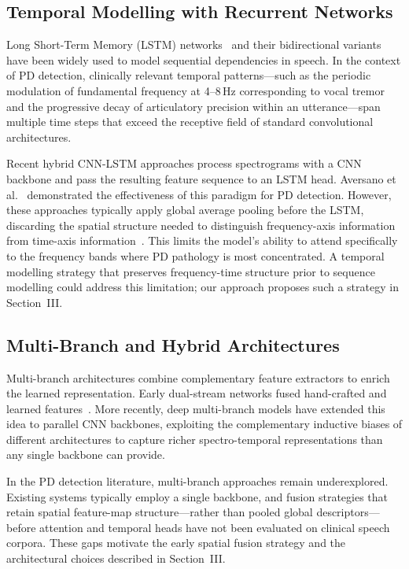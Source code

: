 \documentclass[conference]{IEEEtran}
\begin{document}
\subsection{Temporal Modelling with Recurrent Networks}

Long Short-Term Memory (LSTM) networks~\cite{hochreiter1997} and their bidirectional variants~\cite{graves2005} have been widely used to model sequential dependencies in speech. In the context of PD detection, clinically relevant temporal patterns---such as the periodic modulation of fundamental frequency at 4--8\,Hz corresponding to vocal tremor~\cite{rusz2011} and the progressive decay of articulatory precision within an utterance---span multiple time steps that exceed the receptive field of standard convolutional architectures.

Recent hybrid CNN-LSTM approaches process spectrograms with a CNN backbone and pass the resulting feature sequence to an LSTM head. Aversano et al.~\cite{aversano2024} demonstrated the effectiveness of this paradigm for PD detection. However, these approaches typically apply global average pooling before the LSTM, discarding the spatial structure needed to distinguish frequency-axis information from time-axis information~\cite{aversano2024}. This limits the model's ability to attend specifically to the frequency bands where PD pathology is most concentrated. A temporal modelling strategy that preserves frequency-time structure prior to sequence modelling could address this limitation; our approach proposes such a strategy in Section~III.

\subsection{Multi-Branch and Hybrid Architectures}

Multi-branch architectures combine complementary feature extractors to enrich the learned representation. Early dual-stream networks fused hand-crafted and learned features~\cite{orozco2016}. More recently, deep multi-branch models have extended this idea to parallel CNN backbones, exploiting the complementary inductive biases of different architectures to capture richer spectro-temporal representations than any single backbone can provide.

In the PD detection literature, multi-branch approaches remain underexplored. Existing systems typically employ a single backbone, and fusion strategies that retain spatial feature-map structure---rather than pooled global descriptors---before attention and temporal heads have not been evaluated on clinical speech corpora. These gaps motivate the early spatial fusion strategy and the architectural choices described in Section~III.
\end{document}
